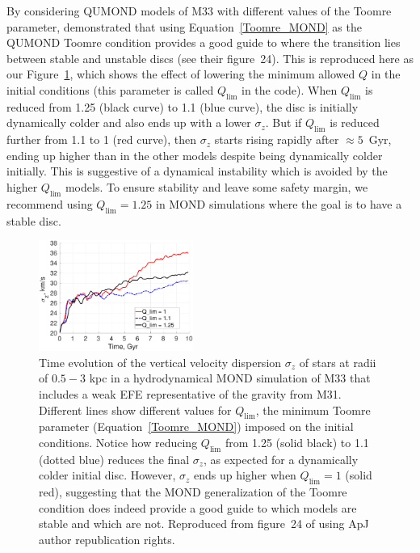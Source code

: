 \documentclass[fleqn,usenatbib,useAMS]{mnras} %
\begin{document}
By considering QUMOND models of M33 with different values of the Toomre parameter, \citet{Banik_2020_M33} demonstrated that using Equation~\ref{Toomre_MOND} as the QUMOND Toomre condition provides a good guide to where the transition lies between stable and unstable discs (see their figure~24). This is reproduced here as our Figure~\ref{Banik_2020_M33_Figure_Q}, which shows the effect of lowering the minimum allowed $Q$ in the initial conditions (this parameter is called $Q_\text{lim}$ in the code). When $Q_\text{lim}$ is reduced from 1.25 (black curve) to 1.1 (blue curve), the disc is initially dynamically colder and also ends up with a lower $\sigma_z$. But if $Q_\text{lim}$ is reduced further from 1.1 to 1 (red curve), then $\sigma_z$ starts rising rapidly after $\approx 5$~Gyr, ending up higher than in the other models despite being dynamically colder initially. This is suggestive of a dynamical instability which is avoided by the higher $Q_\text{lim}$ models. To ensure stability and leave some safety margin, we recommend using $Q_\text{lim} = 1.25$ in MOND simulations where the goal is to have a stable disc.

\begin{figure}
	\centering
	\includegraphics[width=0.45\textwidth]{Banik_2020_M33_Figure_24}
	\caption{Time evolution of the vertical velocity dispersion $\sigma_z$ of stars at radii of $0.5-3$ kpc in a hydrodynamical MOND simulation of M33 that includes a weak EFE representative of the gravity from M31. Different lines show different values for $Q_\text{lim}$, the minimum Toomre parameter (Equation~\ref{Toomre_MOND}) imposed on the initial conditions. Notice how reducing $Q_\text{lim}$ from 1.25 (solid black) to 1.1 (dotted blue) reduces the final $\sigma_z$, as expected for a dynamically colder initial disc. However, $\sigma_z$ ends up higher when $Q_\text{lim} = 1$ (solid red), suggesting that the MOND generalization of the Toomre condition does indeed provide a good guide to which models are stable and which are not. Reproduced from figure~24 of \citet{Banik_2020_M33} using ApJ author republication rights.}
	\label{Banik_2020_M33_Figure_Q}
\end{figure}
\end{document}
